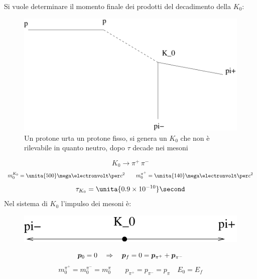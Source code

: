 \begin{Es}
Si vuole determinare il momento finale dei prodotti del decadimento della $K_0$:
\begin{figure}[htbp]
   \centering
   \includegraphics[scale=0.5]{immagini/fisica1/dec_strano}
   \caption{Un protone urta un protone fisso, si genera un $K_0$ che non è rilevabile in quanto neutro, dopo $\tau$ decade nei mesoni}
   \label{}
\end{figure}
\begin{equation*}K_0\rightarrow \pi^+\,\pi^-\end{equation*}
\begin{equation*}m_0^{K_0}=\unita{500}\mega\electronvolt\per c^2\qquad m_0^{\pi^+}=\unita{140}\mega\electronvolt\per c^2\end{equation*}
\begin{equation*}\tau_{K_0}=\unita{0.9\times 10^{-10}}\second\end{equation*}
Nel sistema di $K_0$ l'impulso dei mesoni è:
\begin{figure}[htbp]
   \centering
   \includegraphics[scale=0.5]{immagini/fisica1/dec_strano2}
\end{figure}
\begin{equation*}
\boldsymbol{p}_0=0\quad \Rightarrow \quad \boldsymbol{p}_f=0 = \boldsymbol{p}_{\pi^+}+\boldsymbol{p}_{\pi^-}
\end{equation*}
\begin{equation*}
m_0^{\pi^+}=m_0^{\pi^-}=m_0^{\pi}\qquad p_{\pi^+}=p_{\pi^-}=p_{\pi}\quad E_0=E_f
\end{equation*}


\end{Es}
